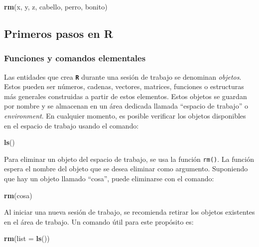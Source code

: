 \documentclass[
]{article}
\newenvironment{Shaded}{\begin{snugshade}}{\end{snugshade}}
\newcommand{\AttributeTok}[1]{\textcolor[rgb]{0.13,0.29,0.53}{#1}}
\newcommand{\FunctionTok}[1]{\textcolor[rgb]{0.13,0.29,0.53}{\textbf{#1}}}
\newcommand{\NormalTok}[1]{#1}
\begin{document}
\begin{Shaded}
\begin{Highlighting}[]
\FunctionTok{rm}\NormalTok{(x, y, z, cabello, perro, bonito)}
\end{Highlighting}
\end{Shaded}

\hypertarget{primerospasos}{%
\subsection{Primeros pasos en R}\label{primerospasos}}

\hypertarget{funciones-y-comandos-elementales}{%
\subsubsection{Funciones y comandos elementales}\label{funciones-y-comandos-elementales}}

Las entidades que crea \textbf{\texttt{R}} durante una sesión de trabajo se denominan \emph{objetos}. Estos pueden ser números, cadenas, vectores, matrices, funciones o estructuras más generales construidas a partir de estos elementos. Estos objetos se guardan por nombre y se almacenan en un área dedicada llamada ``espacio de trabajo'' o \emph{environment}. En cualquier momento, es posible verificar los objetos disponibles en el espacio de trabajo usando el comando:

\begin{Shaded}
\begin{Highlighting}[]
\FunctionTok{ls}\NormalTok{()}
\end{Highlighting}
\end{Shaded}

Para eliminar un objeto del espacio de trabajo, se usa la función \texttt{rm()}. La función espera el nombre del objeto que se desea eliminar como argumento. Suponiendo que hay un objeto llamado ``cosa'', puede eliminarse con el comando:

\begin{Shaded}
\begin{Highlighting}[]
\FunctionTok{rm}\NormalTok{(cosa)}
\end{Highlighting}
\end{Shaded}

Al iniciar una nueva sesión de trabajo, se recomienda retirar los objetos existentes en el área de trabajo. Un comando útil para este propósito es:

\begin{Shaded}
\begin{Highlighting}[]
\FunctionTok{rm}\NormalTok{(}\AttributeTok{list =} \FunctionTok{ls}\NormalTok{())}
\end{Highlighting}
\end{Shaded}
\end{document}

